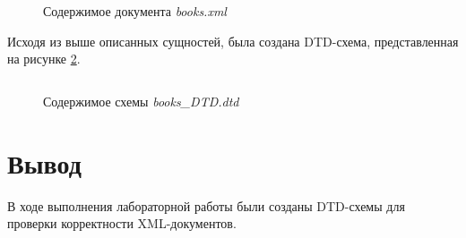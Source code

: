 \documentclass[a4paper, 14pt]{extarticle}
\begin{document}
\inputminted{xml}{../code/task-3/books.xml}
\begin{figure}[H]
  \centering
  \caption{Содержимое документа \textit{books.xml}}
  \label{fig:task-3:books.xml}
\end{figure}

Исходя из выше описанных сущностей, была создана DTD-схема, представленная на
рисунке \ref{fig:task-3:books_DTD.dtd}.

\begin{figure}[H]
  \centering
  \inputminted{dtd}{../code/task-3/books_DTD.dtd}
  \caption{Содержимое схемы \textit{books\_DTD.dtd}}
  \label{fig:task-3:books_DTD.dtd}
\end{figure}

\section{Вывод}

В ходе выполнения лабораторной работы были созданы DTD-схемы для проверки
корректности XML-документов.
\end{document}
